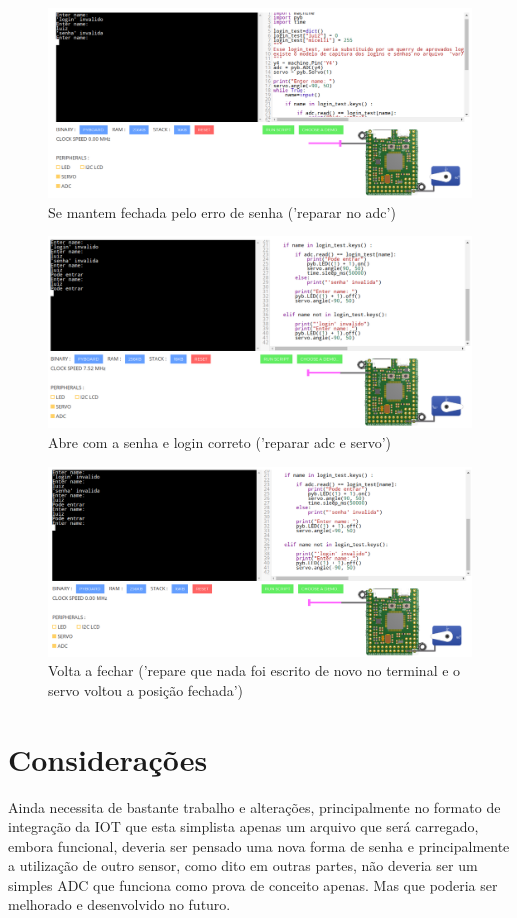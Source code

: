 \documentclass[12pt]{article}
\begin{document}
\begin{figure}[ht]
\centering
\includegraphics[width=.5\textwidth]{imagens/fechada2.png}
\caption{Se mantem fechada pelo erro de senha ('reparar no adc')}
\end{figure}

\begin{figure}[ht]
\centering
\includegraphics[width=.5\textwidth]{imagens/aberta.png}
\caption{Abre com a senha e login correto ('reparar adc e servo')}
\end{figure}
\clearpage
\begin{figure}[ht]
\centering
\includegraphics[width=.5\textwidth]{imagens/fechada3.png}
\caption{Volta a fechar ('repare que nada foi escrito de novo no terminal e o servo voltou a posição fechada')}
\end{figure}

\section{Considerações}
Ainda necessita de bastante trabalho e alterações, principalmente no formato de integração da IOT que esta simplista
apenas um arquivo que será carregado, embora funcional, deveria ser pensado uma nova forma de senha e principalmente a
utilização de outro sensor, como dito em outras partes, não deveria ser um simples ADC que funciona como prova de
conceito apenas. Mas que poderia ser melhorado e desenvolvido no futuro.



\end{document}
